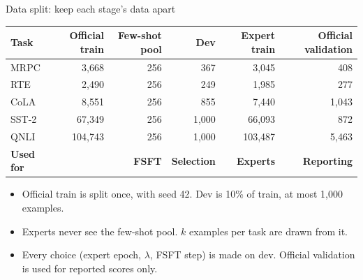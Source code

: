 \begin{frame}{Data split: keep each stage's data apart}
  \centering
  \small
  \begin{tabular}{l r r r r r}
    \toprule
    Task & Official train & Few-shot pool & Dev & Expert train & Official validation\\
    \midrule
    MRPC & 3,668 & 256 & 367 & 3,045 & 408\\
    RTE & 2,490 & 256 & 249 & 1,985 & 277\\
    CoLA & 8,551 & 256 & 855 & 7,440 & 1,043\\
    SST-2 & 67,349 & 256 & 1,000 & 66,093 & 872\\
    QNLI & 104,743 & 256 & 1,000 & 103,487 & 5,463\\
    \midrule
    \textbf{Used for} & & \textbf{FSFT} & \textbf{Selection} & \textbf{Experts} & \textbf{Reporting}\\
    \bottomrule
  \end{tabular}
  \vfill
  \raggedright
  \begin{itemize}
    \item Official train is split once, with seed 42. Dev is 10\% of train, at most 1,000 examples.
    \item Experts never see the few-shot pool. $k$ examples per task are drawn from it.
    \item Every choice (expert epoch, $\lambda$, FSFT step) is made on dev. Official validation is used for reported scores only.
  \end{itemize}
\end{frame}

